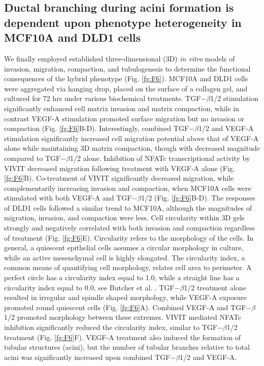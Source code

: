 \documentclass[11pt,letterpaper]{article}
\begin{document}
\subsection*{Ductal branching during acini formation is dependent upon phenotype heterogeneity in MCF10A and DLD1 cells}
We finally employed established three-dimensional (3D) \emph{in vitro} models of invasion, migration, compaction, and tubulogenesis \cite{Dhimolea2010}
to determine the functional consequences of the hybrid phenotype (Fig. \ref{fg:F6}).
MCF10A and DLD1 cells were aggregated via hanging drop, placed on the surface of a collagen gel, and cultured for 72 hrs under various biochemical treatments.
TGF$-\beta$1/2 stimulation significantly enhanced cell matrix invasion and matrix compaction, while in contrast VEGF-A stimulation promoted surface migration but no invasion or compaction (Fig. \ref{fg:F6}B-D).
Interestingly, combined TGF$-\beta$1/2 and VEGF-A stimulation significantly increased cell migration potential above that of VEGF-A alone while maintaining 3D matrix compaction, though with decreased magnitude compared to TGF$-\beta$1/2 alone.
Inhibition of NFATc transcriptional activity by VIVIT decreased migration following treatment with VEGF-A alone (Fig. \ref{fg:F6}B).
Co-treatment of VIVIT significantly decreased migration, while complementarily increasing invasion and compaction, when MCF10A cells were stimulated with both VEGF-A and TGF$-\beta$1/2 (Fig. \ref{fg:F6}B-D).
The responses of DLD1 cells followed a similar trend to MCF10A, although the magnitudes of migration, invasion, and compaction were less.
Cell circularity within 3D gels strongly and negatively correlated with both invasion and compaction regardless of treatment (Fig. \ref{fg:F6}E).
Circularity refers to the morphology of the cells. In general, a quiescent epithelial cells assumes a circular morphology in culture, while an active mesenchymal cell is highly elongated.
The circularity index, a common means of quantifying cell morphology, relates cell area to perimeter.
A perfect circle has a circularity index equal to 1.0, while a straight line has a circularity index equal to 0.0, see Butcher et al. \cite{Butcher:2004aa}.
TGF$-\beta$1/2 treatment alone resulted in irregular and spindle shaped morphology, while VEGF-A exposure promoted round quiescent cells (Fig. \ref{fg:F6}A).
Combined VEGF-A and TGF$-\beta$1/2 promoted morphology between these extremes.
VIVIT mediated NFATc inhibition significantly reduced the circularity index, similar to TGF$-\beta$1/2 treatment (Fig. \ref{fg:F6}F).
VEGF-A treatment also induced the formation of tubular structures (acini), but the number of tubular branches relative to total acini was significantly increased upon combined TGF$-\beta$1/2 and VEGF-A.
\end{document}
